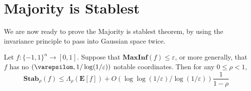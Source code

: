 \section{Majority is Stablest}

We are now ready to prove the Majority is stablest theorem, by using the invariance principle to pass into Gaussian space twice.

\begin{theorem}
    Let $f: \{ -1, 1 \}^n \to [0,1]$. Suppose that $\mathbf{MaxInf}(f) \leq \varepsilon$, or more generally, that $f$ has no $(\varepsilom, 1/\log(1/\varepsilon))$ notable coordinates. Then for any $0 \leq \rho < 1$,
    \[ \mathbf{Stab}_\rho(f) \leq \Lambda_\rho(\mathbf{E}[f]) + O(\log \log(1/\varepsilon)/\log(1/\varepsilon)) \frac{1}{1 - \rho} \]
\end{theorem}

